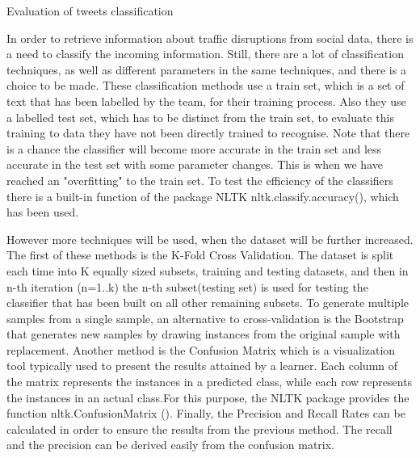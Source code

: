 Evaluation of tweets classification

In order to retrieve information about traffic disruptions from social data, there is a need to classify the incoming information.
Still, there are a lot of classification techniques, as well as different parameters in the same techniques, and there is a choice to be made. These classification methods use a train set, which is a set of text that has been labelled by the team, for their training process. Also they use a labelled test set, which has to be distinct from the train set, to evaluate this training to data they have not been directly trained to recognise. Note that there is a chance the classifier will become more accurate in the train set and less accurate in the test set with some parameter changes. This is when we have reached an "overfitting" to the train set.
To test the efficiency of the classifiers there is a built-in function of the package NLTK nltk.classify.accuracy(), which has been used.

However more techniques will be used, when the dataset will be further increased. The first of these methods is the K-Fold Cross Validation. The dataset is split each time into K equally sized subsets, training and testing datasets, and then in n-th iteration (n=1..k) the n-th subset(testing set) is used for testing the classifier that has been built on all other remaining subsets. To generate multiple samples from a single sample, an alternative to cross-validation is the Bootstrap that generates new samples by drawing instances from the original sample with replacement. Another method is the Confusion Matrix which is a visualization tool typically used to present the results attained by a learner. Each column of the matrix represents the instances in a predicted class, while each row represents the instances in an actual class.For this purpose, the NLTK package provides the function nltk.ConfusionMatrix (). Finally, the Precision and Recall Rates can be calculated in order to ensure the results from the previous method. The recall and the precision can be derived easily from the confusion matrix.